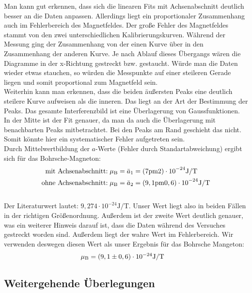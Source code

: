 Man kann gut erkennen, dass sich die linearen Fits mit Achsenabschnitt deutlich besser an die Daten anpassen. Allerdings liegt ein proportionaler Zusammenhang auch im Fehlerbereich des Magnetfeldes. Der große Fehler des Magnetfeldes stammt von den zwei unterschiedlichen Kalibrierungskurven. Während der Messung ging der Zusammenhang von der einen Kurve über in den Zusammenhang der anderen Kurve. Je nach Ablauf dieses Übergangs wären die Diagramme in der x-Richtung gestreckt bzw. gestaucht. Würde man die Daten wieder etwas stauchen, so würden die Messpunkte auf einer steileren Gerade liegen und somit proportional zum Magnetfeld sein.\\
Weiterhin kann man erkennen, dass die beiden äußersten Peaks eine deutlich steilere Kurve aufweisen als die inneren. Das liegt an der Art der Bestimmung der Peaks. Das gesamte Interferenzbild ist eine Überlagerung von Gaussfunktionen. In der Mitte ist der Fit genauer, da man da auch die Überlagerung mit benachbarten Peaks mitbetrachtet. Bei den Peaks am Rand geschieht das nicht. Somit könnte hier ein systematischer Fehler aufgetreten sein.\\
 
Durch Mittelwertbildung der $a$-Werte (Fehler durch Standartabweichung) ergibt sich für das Bohrsche-Magneton:\\
\begin{align*}
\text{mit Achsenabschnitt:}\;& \mu\ind{B} = \bar{a}_1 = \si{(7 \pm 2) \cdot 10^{-24} \joule/\tesla}\\
\text{ohne Achsenabschnitt:}\;& \mu\ind{B} = \bar{a}_2 = \si{(9,1 \pm 0,6) \cdot 10^{-24} \joule/\tesla}\\
\end{align*}\\
Der Literaturwert lautet: $9,274 \cdot 10^{-24} \si{\joule/\tesla}$\cite{wiki_konst}. Unser Wert liegt also in beiden Fällen in der richtigen Größenordnung. Außerdem ist der zweite Wert deutlich genauer, was ein weiterer Hinweis darauf ist, dass die Daten während des Versuches gestreckt worden sind. Außerdem liegt der wahre Wert im Fehlerbereich. Wir verwenden deswegen diesen Wert als unser Ergebnis für das Bohrsche Mangeton:
\begin{align*}
\mu\ind{B} &= (9,1 \pm 0,6) \cdot 10^{-24} \si{\joule/\tesla}
\end{align*}

\subsection{Weitergehende Überlegungen}
